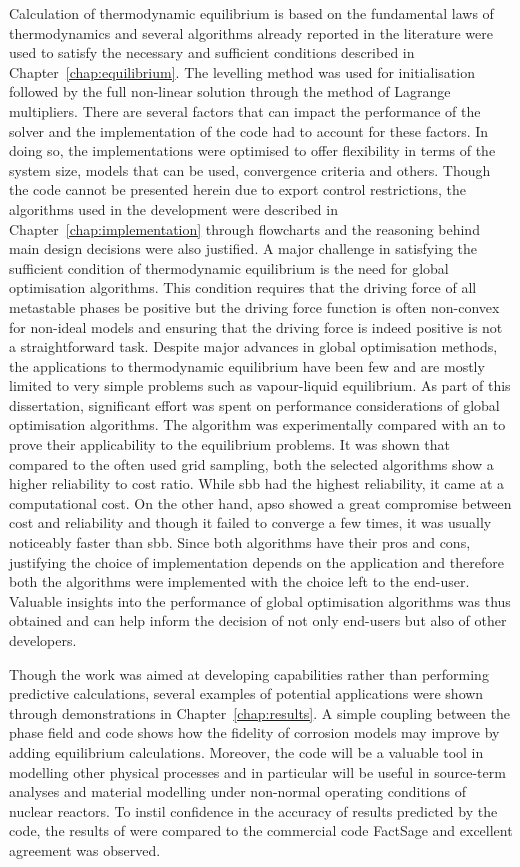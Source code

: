 	Calculation of thermodynamic equilibrium is based on the fundamental laws of thermodynamics and several algorithms already reported in the literature were used to satisfy the necessary and sufficient conditions described in Chapter~\ref{chap:equilibrium}. The levelling method was used for initialisation followed by the full non-linear solution through the method of Lagrange multipliers. There are several factors that can impact the performance of the solver and the implementation of the code had to account for these factors. In doing so, the implementations were optimised to offer flexibility in terms of the system size, models that can be used, convergence criteria and others. Though the code cannot be presented herein due to export control restrictions, the algorithms used in the development were described in Chapter~\ref{chap:implementation} through flowcharts and the reasoning behind main design decisions were also justified. A major challenge in satisfying the sufficient condition of thermodynamic equilibrium is the need for global optimisation algorithms. This condition requires that the driving force of all metastable phases be positive but the driving force function is often non-convex for non-ideal models and ensuring that the driving force is indeed positive is not a straightforward task. Despite major advances in global optimisation methods, the applications to thermodynamic equilibrium have been few and are mostly limited to very simple problems such as vapour-liquid equilibrium. As part of this dissertation, significant effort was spent on performance considerations of global optimisation algorithms. The  algorithm was experimentally compared with an  to prove their applicability to the equilibrium problems. It was shown that compared to the often used grid sampling, both the selected algorithms show a higher reliability to cost ratio. While \gls{sbb} had the highest reliability, it came at a computational cost. On the other hand, \gls{apso} showed a great compromise between cost and reliability and though it failed to converge a few times, it was usually noticeably faster than \gls{sbb}. Since both algorithms have their pros and cons, justifying the choice of implementation depends on the application and therefore both the algorithms were implemented with the choice left to the end-user. Valuable insights into the performance of global optimisation algorithms was thus obtained and can help inform the decision of not only end-users but also of other developers.
	
	Though the work was aimed at developing capabilities rather than performing predictive calculations, several examples of potential applications were shown through demonstrations in Chapter~\ref{chap:results}. A simple coupling between the phase field and {\GEM} code shows how the fidelity of corrosion models may improve by adding equilibrium calculations. Moreover, the code will be a valuable tool in modelling other physical processes and in particular will be useful in source-term analyses and material modelling under non-normal operating conditions of nuclear reactors. To instil confidence in the accuracy of results predicted by the code, the results of {\GEM} were compared to the commercial code FactSage and excellent agreement was observed.
	

